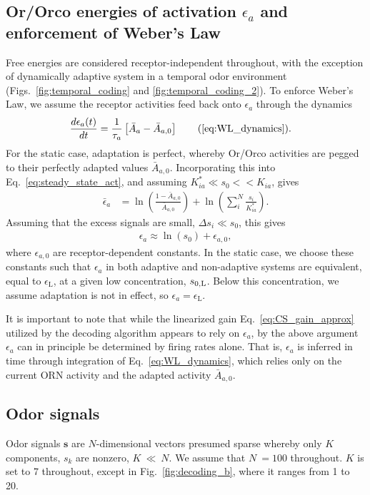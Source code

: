 \subsection{Or/Orco  energies of activation $\epsilon_a$ and enforcement of Weber's Law}
Free energies are considered receptor-independent throughout, with the exception of dynamically adaptive system in a temporal odor environment (Figs.~\ref{fig:temporal_coding} and \ref{fig:temporal_coding_2}). To enforce Weber's Law, we assume the receptor activities feed back onto $\epsilon_a$ through the dynamics
\begin{align}
\frac{d\epsilon_a(t)}{dt} &= \frac{1}{\tau_a}\left[\bar{A}_a - \bar {A}_{a,0}\right] \tag{\ref{eq:WL_dynamics}}.
\end{align}
For the static case, adaptation is perfect, whereby Or/Orco activities are pegged to their perfectly adapted values $\bar {A}_{a,0}$. Incorporating this into Eq.~\ref{eq:steady_state_act}, and assuming  $K^*_{ia} \ll s_0 << K_{ia}$, gives
\begin{align}
\bar \epsilon_a &= \ln\left(\frac{1-\bar {A}_{a,0}}{\bar {A}_{a,0}}\right) + \ln\left(\sum_i^N\frac{s_i}{K_{ia}^*}\right).
\label{eq:adapted_epsilon}
\end{align}
Assuming that the excess signals are small, $\Delta s_i \ll s_0$, this gives 
\begin{align}
\epsilon_a \approx \ln(s_0) + \epsilon_{a, 0},
\label{eq:WL_approx}
\end{align} 
where $\epsilon_{a, 0}$ are receptor-dependent constants. In the static case, we choose these constants such that $\epsilon_{a}$ in both adaptive and non-adaptive systems are equivalent, equal to $\epsilon_{\text {L}}$, at a given low concentration, $s_{0, \text L}$.  Below this concentration, we assume adaptation is not in effect, so $\epsilon_a  = \epsilon_{\text {L}}$.  

It is important to note that while the linearized gain Eq.~\ref{eq:CS_gain_approx} utilized by the decoding algorithm appears to rely on $\epsilon_a$, by the above argument $\epsilon_a$ can in principle be determined by firing rates alone. That is, $\epsilon_a$ is inferred in time through integration of Eq.~\ref{eq:WL_dynamics}, which relies only on the current ORN activity and the adapted activity $\bar{A}_{a, 0}$. 


\subsection{Odor signals}
Odor signals $\mathbf s$ are $N$-dimensional vectors presumed sparse whereby only $K$ components, $s_k$ are nonzero,  $K~\ll~N$. We assume that $N~=100$ throughout. $K$ is set to 7 throughout, except in Fig.~\ref{fig:decoding_b}, where it ranges from 1 to 20. 

